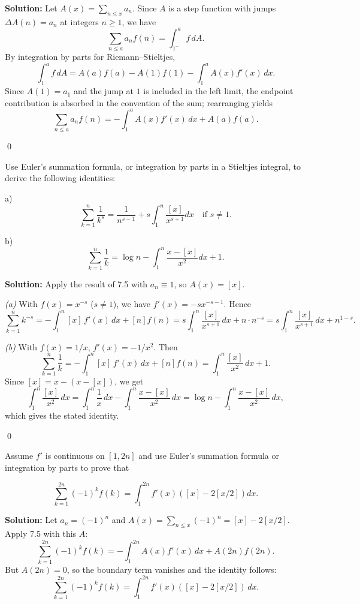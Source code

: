 \noindent\textbf{Solution:}
Let $A(x)=\sum_{n\le x}a_n$. Since $A$ is a step function with jumps $\Delta A(n)=a_n$ at integers $n\ge 1$, we have
\[\sum_{n\le a} a_n f(n)=\int_{1^-}^{a} f\,dA.
\]
By integration by parts for Riemann–Stieltjes,
\[\int_{1}^{a} f\,dA= A(a)f(a)-A(1)f(1)-\int_{1}^{a} A(x) f'(x)\,dx.
\]
Since $A(1)=a_1$ and the jump at $1$ is included in the left limit, the endpoint contribution is absorbed in the convention of the sum; rearranging yields
\[\sum_{n\le a} a_n f(n)= -\int_{1}^{a} A(x) f'(x)\,dx + A(a)f(a).\]




\qed
\begin{problembox}
Use Euler's summation formula, or integration by parts in a Stieltjes integral, to derive the following identities:

a) \[ \sum_{k=1}^n \frac{1}{k^s} = \frac{1}{n^{s-1}} + s \int_1^n \frac{[x]}{x^{s+1}} dx \quad \text{if } s \neq 1. \]

b) \[ \sum_{k=1}^n \frac{1}{k} = \log n - \int_1^n \frac{x - [x]}{x^2} dx + 1. \]
\end{problembox}

\noindent\textbf{Solution:}
Apply the result of 7.5 with $a_n\equiv 1$, so $A(x)=[x]$.

\textit{(a)} With $f(x)=x^{-s}$ ($s\ne 1$), we have $f'(x)=-s x^{-s-1}$. Hence
\[\sum_{k=1}^n k^{-s} = -\int_1^n [x]\,f'(x)\,dx + [n] f(n) = s\int_1^n \frac{[x]}{x^{s+1}}\,dx + n\cdot n^{-s}= s\int_1^n \frac{[x]}{x^{s+1}}\,dx + n^{1-s}.
\]

\textit{(b)} With $f(x)=1/x$, $f'(x)=-1/x^2$. Then
\[\sum_{k=1}^n \frac{1}{k} = -\int_1^n [x]\,f'(x)\,dx + [n]f(n) = \int_1^n \frac{[x]}{x^2}\,dx + 1.
\]
Since $[x]=x-(x-[x])$, we get
\[\int_1^n \frac{[x]}{x^2}\,dx = \int_1^n \frac{1}{x}\,dx - \int_1^n \frac{x-[x]}{x^2}\,dx = \log n - \int_1^n \frac{x-[x]}{x^2}\,dx,
\]
which gives the stated identity.




\qed
\begin{problembox}
Assume $f'$ is continuous on $[1, 2n]$ and use Euler's summation formula or integration by parts to prove that

\[ \sum_{k=1}^{2n} (-1)^k f(k) = \int_1^{2n} f'(x)([x] - 2[x/2]) dx. \]
\end{problembox}

\noindent\textbf{Solution:}
Let $a_n=(-1)^n$ and $A(x)=\sum_{n\le x}(-1)^n=[x]-2[x/2]$. Apply 7.5 with this $A$:
\[\sum_{k=1}^{2n}(-1)^k f(k)= -\int_1^{2n} A(x) f'(x)\,dx + A(2n) f(2n).
\]
But $A(2n)=0$, so the boundary term vanishes and the identity follows:
\[\sum_{k=1}^{2n}(-1)^k f(k)=\int_1^{2n} f'(x)([x]-2[x/2])\,dx.\]




